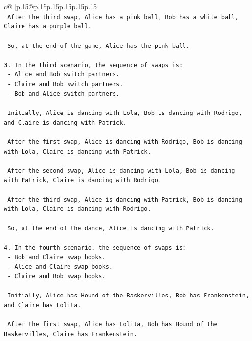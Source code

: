 \documentclass{article}
\begin{document}
{\begin{supertabular}{c@{$\;$}|p{.15\linewidth}@{}p{.15\linewidth}p{.15\linewidth}p{.15\linewidth}p{.15\linewidth}p{.15\linewidth}}
{{{\\ 
\texttt{   After the third swap, Alice has a pink ball, Bob has a white ball, Claire has a purple ball.} \\
\\ 
\texttt{   So, at the end of the game, Alice has the pink ball.} \\
\\ 
\texttt{3. In the third scenario, the sequence of swaps is:} \\
\texttt{   {-} Alice and Bob switch partners.} \\
\texttt{   {-} Claire and Bob switch partners.} \\
\texttt{   {-} Bob and Alice switch partners.} \\
\\ 
\texttt{   Initially, Alice is dancing with Lola, Bob is dancing with Rodrigo, and Claire is dancing with Patrick.} \\
\\ 
\texttt{   After the first swap, Alice is dancing with Rodrigo, Bob is dancing with Lola, Claire is dancing with Patrick.} \\
\\ 
\texttt{   After the second swap, Alice is dancing with Lola, Bob is dancing with Patrick, Claire is dancing with Rodrigo.} \\
\\ 
\texttt{   After the third swap, Alice is dancing with Patrick, Bob is dancing with Lola, Claire is dancing with Rodrigo.} \\
\\ 
\texttt{   So, at the end of the dance, Alice is dancing with Patrick.} \\
\\ 
\texttt{4. In the fourth scenario, the sequence of swaps is:} \\
\texttt{   {-} Bob and Claire swap books.} \\
\texttt{   {-} Alice and Claire swap books.} \\
\texttt{   {-} Claire and Bob swap books.} \\
\\ 
\texttt{   Initially, Alice has Hound of the Baskervilles, Bob has Frankenstein, and Claire has Lolita.} \\
\\ 
\texttt{   After the first swap, Alice has Lolita, Bob has Hound of the Baskervilles, Claire has Frankenstein.} \\
\\ 
}}}
\end{supertabular}}
\end{document}
